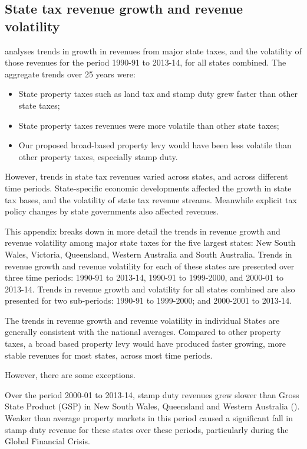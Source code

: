 \begin{subappendices}
\chapter{State tax revenue growth and revenue volatility\label{appendix:PROP}}
 analyses trends in growth in revenues from major state taxes, and the volatility of those revenues for the period 1990-91 to 2013-14, for all states combined. The aggregate trends over 25 years were:

\begin{itemize}
\item	State property taxes such as land tax and stamp duty grew faster than other state taxes;
\item	State property taxes revenues were more volatile than other state taxes;
\item	Our proposed broad-based property levy would have been less volatile than other property taxes, especially stamp duty.
\end{itemize}

However, trends in state tax revenues varied across states, and across different time periods. State-specific economic developments affected the growth in state tax bases, and the volatility of state tax revenue streams. Meanwhile explicit tax policy changes by state governments also affected revenues.

This appendix breaks down in more detail the trends in revenue growth and revenue volatility among major state taxes for the five largest states: New South Wales, Victoria, Queensland, Western Australia and South Australia. Trends in revenue growth and revenue volatility for each of these states are presented over three time periods: 1990-91 to 2013-14, 1990-91 to 1999-2000, and 2000-01 to 2013-14. Trends in revenue growth and volatility for all states combined are also presented for two sub-periods: 1990-91 to 1999-2000; and 2000-2001 to 2013-14.

The trends in revenue growth and revenue volatility in individual States are generally consistent with the national averages. Compared to other property taxes, a broad based property levy would have produced faster growing, more stable revenues for most states, across most time periods.

However, there are some exceptions.  

Over the period 2000-01 to 2013-14, stamp duty revenues grew slower than Gross State Product (GSP) in New South Wales, Queensland and Western Australia (). Weaker than average property markets in this period caused a significant fall in stamp duty revenue for these states over these periods, particularly during the Global Financial Crisis. 


\end{subappendices}

